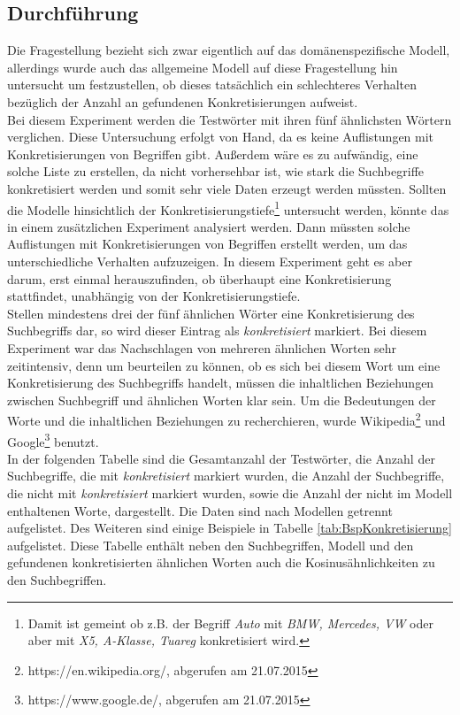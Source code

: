 \documentclass[12pt,a4paper]{report}
\begin{document}
		\subsection*{Durchführung}
		Die Fragestellung bezieht sich zwar eigentlich auf das domänenspezifische Modell, allerdings wurde auch das allgemeine Modell auf diese Fragestellung hin untersucht um festzustellen, ob dieses tatsächlich ein schlechteres Verhalten bezüglich der Anzahl an gefundenen Konkretisierungen aufweist.\\
		Bei diesem Experiment werden die Testwörter mit ihren fünf ähnlichsten Wörtern verglichen. Diese Untersuchung erfolgt von Hand, da es keine Auflistungen mit Konkretisierungen von Begriffen gibt. Außerdem wäre es zu aufwändig, eine solche Liste zu erstellen, da nicht vorhersehbar ist, wie stark die Suchbegriffe konkretisiert werden und somit sehr viele Daten erzeugt werden müssten. Sollten die Modelle hinsichtlich der Konkretisierungstiefe\footnote{Damit ist gemeint ob z.B. der Begriff \textit{Auto} mit \textit{BMW, Mercedes, VW} oder aber mit \textit{X5, A-Klasse, Tuareg} konkretisiert wird.} untersucht werden, könnte das in einem zusätzlichen Experiment analysiert werden. Dann müssten solche Auflistungen mit Konkretisierungen von Begriffen erstellt werden, um das unterschiedliche Verhalten aufzuzeigen. In diesem Experiment geht es aber darum, erst einmal herauszufinden, ob überhaupt eine Konkretisierung stattfindet, unabhängig von der Konkretisierungstiefe.\\	
		 Stellen mindestens drei der fünf ähnlichen Wörter eine Konkretisierung des Suchbegriffs dar, so wird dieser Eintrag als \textit{konkretisiert} markiert. Bei diesem Experiment war das Nachschlagen von mehreren ähnlichen Worten sehr zeitintensiv, denn um beurteilen zu können, ob es sich bei diesem Wort um eine Konkretisierung des Suchbegriffs handelt, müssen die inhaltlichen Beziehungen zwischen Suchbegriff und ähnlichen Worten klar sein. Um die Bedeutungen der Worte und die inhaltlichen Beziehungen zu recherchieren, wurde Wikipedia\footnote{https://en.wikipedia.org/, abgerufen am 21.07.2015} und Google\footnote{https://www.google.de/, abgerufen am 21.07.2015} benutzt.\\
		
		In der folgenden Tabelle sind die Gesamtanzahl der Testwörter, die Anzahl der Suchbegriffe, die mit \textit{konkretisiert} markiert wurden, die Anzahl der Suchbegriffe,  die nicht mit \textit{konkretisiert} markiert wurden, sowie die Anzahl der nicht im Modell enthaltenen Worte, dargestellt. Die Daten sind nach Modellen getrennt aufgelistet. Des Weiteren sind einige Beispiele in Tabelle \ref{tab:BspKonkretisierung} aufgelistet. Diese Tabelle enthält neben den Suchbegriffen, Modell und den gefundenen konkretisierten ähnlichen Worten auch die Kosinusähnlichkeiten zu den Suchbegriffen.
		
\end{document}
